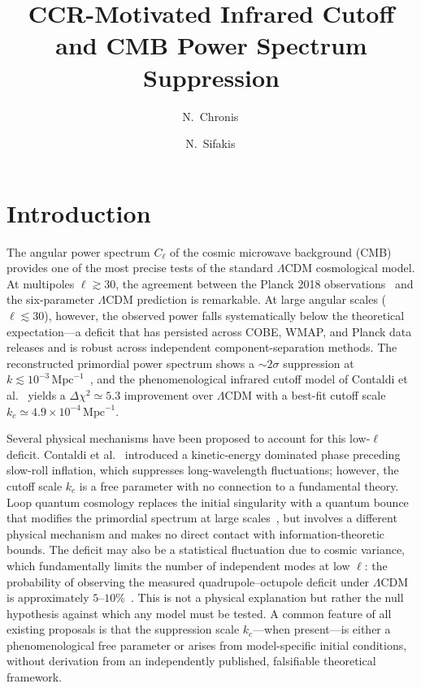 \documentclass[a4paper,11pt]{article}
\title{CCR-Motivated Infrared Cutoff and CMB Power Spectrum Suppression}
\author[a]{N.~Chronis\,\orcidA{}}
\author[b]{N.~Sifakis\,\orcidB{}}
\affiliation[a]{Department of Computer Science \& Engineering,
  University of Crete, 70013 Heraklion, Greece}
\affiliation[b]{Department of Production Engineering and Management,
  Technical University of Crete, 73100 Chania, Greece}
\begin{document}
\maketitle

\section{Introduction}
\label{sec:intro}

The angular power spectrum $C_\ell$ of the cosmic microwave background (CMB)
provides one of the most precise tests of the standard $\Lambda$CDM cosmological
model. At multipoles $\ell \gtrsim 30$, the agreement between the Planck 2018
observations~\cite{Planck:2018params} and the six-parameter $\Lambda$CDM
prediction is remarkable. At large angular scales ($\ell \lesssim 30$), however,
the observed power falls systematically below the theoretical expectation---a
deficit that has persisted across COBE, WMAP, and Planck data releases and is
robust across independent component-separation methods. The reconstructed
primordial power spectrum shows a $\sim 2\sigma$ suppression at
$k \lesssim 10^{-3}\,\mathrm{Mpc}^{-1}$~\cite{Planck:2018inflation}, and the
phenomenological infrared cutoff model of Contaldi et
al.~\cite{Contaldi:2003} yields a $\Delta\chi^2 \simeq 5.3$ improvement over
$\Lambda$CDM with a best-fit cutoff scale
$k_c \simeq 4.9 \times 10^{-4}\,\mathrm{Mpc}^{-1}$.

Several physical mechanisms have been proposed to account for this low-$\ell$
deficit. Contaldi et al.~\cite{Contaldi:2003} introduced a kinetic-energy
dominated phase preceding slow-roll inflation, which suppresses long-wavelength
fluctuations; however, the cutoff scale $k_c$ is a free parameter with no
connection to a fundamental theory. Loop quantum cosmology replaces the initial
singularity with a quantum bounce that modifies the primordial spectrum at large
scales~\cite{Ashtekar:2011,Agullo:2013}, but involves a different physical
mechanism and makes no direct contact with information-theoretic bounds. The deficit may also be a statistical fluctuation due to cosmic variance, which
fundamentally limits the number of independent modes at low $\ell$: the
probability of observing the measured quadrupole--octupole deficit under
$\Lambda$CDM is approximately $5$--$10\%$~\cite{Efstathiou:2004,Planck:2018params}.
This is not a physical explanation but rather the null hypothesis against which
any model must be tested.
A common feature of all existing proposals is that the suppression scale
$k_c$---when present---is either a phenomenological free parameter or arises
from model-specific initial conditions, without derivation from an
independently published, falsifiable theoretical framework.
\end{document}
